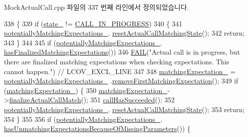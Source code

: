 Mock\+Actual\+Call.\+cpp 파일의 337 번째 라인에서 정의되었습니다.


\begin{DoxyCode}
338 \{
339     \textcolor{keywordflow}{if} (\hyperlink{class_mock_checked_actual_call_a9b5ca51a5cc79a6f6c83f0f327432078}{state\_} != \hyperlink{class_mock_checked_actual_call_a51287301ad26cf1a31a1e33a4fd76e8ca4a60ea44a546fda90c0ec88ff6c185cf}{CALL\_IN\_PROGRESS})
340     \{
341         \hyperlink{class_mock_checked_actual_call_a4fc6bec7509ed6eb28096956758c030a}{potentiallyMatchingExpectations\_}.
      \hyperlink{class_mock_expected_calls_list_a4c7ee87e12972e0504de732ae6f90177}{resetActualCallMatchingState}();
342         \textcolor{keywordflow}{return};
343     \}
344 
345     \textcolor{keywordflow}{if} (\hyperlink{class_mock_checked_actual_call_a4fc6bec7509ed6eb28096956758c030a}{potentiallyMatchingExpectations\_}.
      \hyperlink{class_mock_expected_calls_list_aaf2a3bc73b6efb9e1971abf8981a1414}{hasFinalizedMatchingExpectations}())
346         \hyperlink{_utest_macros_8h_a5b870ba9f143d10f76df4fa5aa01d58f}{FAIL}(\textcolor{stringliteral}{"Actual call is in progress, but there are finalized matching expectations when checking
       expectations. This cannot happen."}) \textcolor{comment}{// LCOV\_EXCL\_LINE}
347 
348     \hyperlink{class_mock_checked_actual_call_aca733859eb143b7a7bf611a39d94d6f6}{matchingExpectation\_} = \hyperlink{class_mock_checked_actual_call_a4fc6bec7509ed6eb28096956758c030a}{potentiallyMatchingExpectations\_}
      .\hyperlink{class_mock_expected_calls_list_ac8726365c168eec6edba33716889bc69}{removeFirstMatchingExpectation}();
349     \textcolor{keywordflow}{if} (\hyperlink{class_mock_checked_actual_call_aca733859eb143b7a7bf611a39d94d6f6}{matchingExpectation\_}) \{
350         \hyperlink{class_mock_checked_actual_call_aca733859eb143b7a7bf611a39d94d6f6}{matchingExpectation\_}->\hyperlink{class_mock_checked_expected_call_a4c18f2902dceaf212af310db05ae6837}{finalizeActualCallMatch}();
351         \hyperlink{class_mock_checked_actual_call_ae81fb048e3c671dcea98e758ce893af5}{callHasSucceeded}();
352         \hyperlink{class_mock_checked_actual_call_a4fc6bec7509ed6eb28096956758c030a}{potentiallyMatchingExpectations\_}.
      \hyperlink{class_mock_expected_calls_list_a4c7ee87e12972e0504de732ae6f90177}{resetActualCallMatchingState}();
353         \textcolor{keywordflow}{return};
354     \}
355 
356     \textcolor{keywordflow}{if} (\hyperlink{class_mock_checked_actual_call_a4fc6bec7509ed6eb28096956758c030a}{potentiallyMatchingExpectations\_}.
      \hyperlink{class_mock_expected_calls_list_aeed6547f5817eb530c06ddbfb2ea4103}{hasUnmatchingExpectationsBecauseOfMissingParameters}()) \{

\end{DoxyCode}
